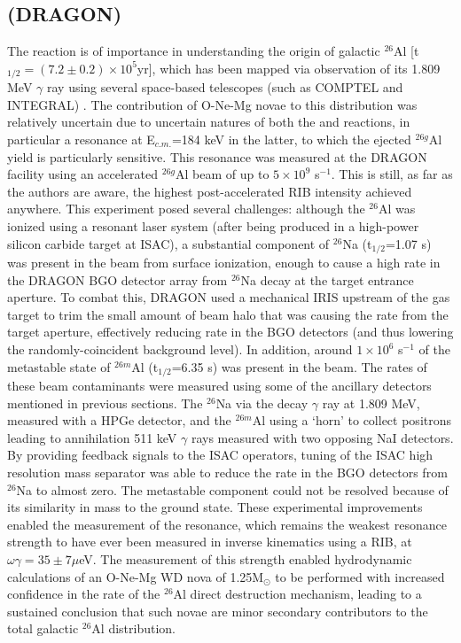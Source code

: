 \subsection{ (DRAGON)}
The  reaction is of importance in understanding the origin of galactic $^{26}$Al [t$_{1/2}=(7.2\pm0.2)\times10^{5}$yr], which has been mapped via observation of its 1.809 MeV $\gamma$ ray using several space-based telescopes (such as COMPTEL and INTEGRAL) \cite{smi03,kno04,die95}. The contribution of O-Ne-Mg novae to this distribution was relatively uncertain due to uncertain natures of both the  and  reactions, in particular a resonance at E$_{c.m.}$=184 keV in the latter, to which the ejected $^{26g}$Al yield is particularly sensitive. This resonance was measured \cite{rui06} at the DRAGON facility using an accelerated $^{26g}$Al beam of up to $5\times10^{9}$ s$^{-1}$. This is still, as far as the authors are aware, the highest post-accelerated RIB intensity achieved anywhere. This experiment posed several challenges: although the $^{26}$Al was ionized using a resonant laser system (after being produced in a high-power silicon carbide target at ISAC), a substantial component of $^{26}$Na (t$_{1/2}$=1.07 s) was present in the beam from surface ionization, enough to cause a high rate in the DRAGON BGO detector array from $^{26}$Na decay at the target entrance aperture. To combat this, DRAGON used  a mechanical IRIS upstream of the gas target to trim the small amount of beam halo that was causing the rate from the target aperture, effectively reducing rate in the BGO detectors (and thus lowering the randomly-coincident background level). In addition, around $1\times10^{6}$ s$^{-1}$ of the metastable state of $^{26m}$Al (t$_{1/2}$=6.35 s) was present in the beam. The rates of these beam contaminants were measured using some of the ancillary detectors mentioned in previous sections. The $^{26}$Na via the decay $\gamma$ ray at 1.809 MeV, measured with a HPGe detector, and the $^{26m}$Al using a `horn' to collect positrons leading to annihilation 511 keV $\gamma$ rays measured with two opposing NaI detectors. By providing feedback signals to the ISAC operators, tuning of the ISAC high resolution mass separator was able to reduce the rate in the BGO detectors from $^{26}$Na to almost zero. The metastable component could not be resolved because of its similarity in mass to the ground state. 
These experimental improvements enabled the measurement of the resonance, which remains the weakest resonance strength to have ever been measured in inverse kinematics using a RIB, at $\omega\gamma=35\pm7 \mu$eV. 
The measurement of this strength enabled hydrodynamic calculations of an O-Ne-Mg WD nova of 1.25M$_{\odot}$ to be performed with increased confidence in the rate of the $^{26}$Al direct destruction mechanism, leading to a sustained conclusion that such novae are minor secondary contributors to the total galactic $^{26}$Al distribution. 

